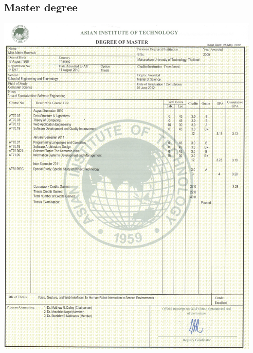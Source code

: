 \documentclass[11pt,a4paper,roman]{moderncv}        %
\begin{document}
\subsection{Master degree}
\includegraphics[width=\textwidth]{images/master_1}
\clearpage
\end{document}
